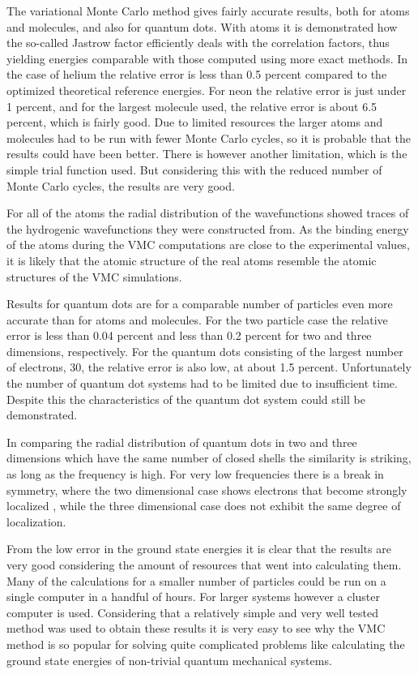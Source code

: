 The variational Monte Carlo method gives fairly accurate results, both
for atoms and molecules, and also for quantum dots. With atoms it is
demonstrated how the so-called Jastrow factor efficiently deals with
the correlation factors, thus yielding energies comparable with those
computed using more exact methods. In the case of helium the relative
error is less than 0.5 percent compared to the optimized theoretical 
reference energies. For neon the relative error is just under 1
percent, and for the largest molecule used, the relative error is
about 6.5 percent, which is fairly good. Due to limited resources the
larger atoms and molecules had to be run with fewer Monte Carlo
cycles, so it is probable that the results could have been
better. There is however another limitation, which is the simple trial
function used. But considering this with the reduced number of Monte
Carlo cycles, the results are very good.

For all of the atoms the radial distribution of the wavefunctions
showed traces of the hydrogenic wavefunctions they were constructed
from. As the binding energy of the atoms during the VMC computations
are close to the experimental values, it is likely that the atomic
structure of the real atoms resemble the atomic structures of the VMC
simulations.

Results for quantum dots are for a comparable number of particles even
more accurate than for atoms and molecules. For the two particle case
the relative error is less than 0.04 percent and less than 0.2 percent
for two and three dimensions, respectively. For the quantum dots
consisting of the largest number of electrons, 30, the relative error
is also low, at about 1.5 percent. Unfortunately the number of quantum
dot systems had to be limited due to insufficient time. Despite this
the characteristics of the quantum dot system could still be
demonstrated.

In comparing the radial distribution of quantum dots in two and three
dimensions which have the same number of closed shells the similarity
is striking, as long as the frequency is high. For very low
frequencies there is a break in symmetry, where the two dimensional
case shows electrons that become strongly localized , while the three dimensional case does not exhibit the same degree of localization. 

From the low error in the ground state energies it is clear that the
results are very good considering the amount of resources that went
into calculating them. Many of the calculations for a smaller number
of particles could be run on a single computer in a handful of
hours. For larger systems however a cluster computer is
used. Considering that a relatively simple and very well tested method
was used to obtain these results it is very easy to see why the VMC method is so
popular for solving quite complicated problems like calculating the
ground state energies of non-trivial quantum mechanical systems.

